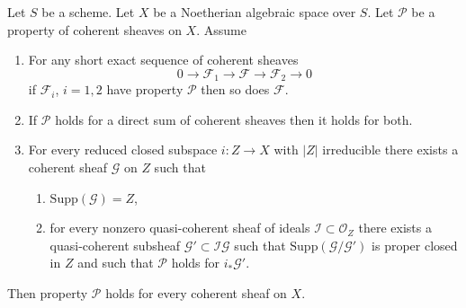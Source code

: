 \begin{lemma}
\label{lemma-property-higher-rank-cohomological}
Let $S$ be a scheme. Let $X$ be a Noetherian algebraic space over $S$.
Let $\mathcal{P}$ be a property of coherent sheaves on $X$. Assume
\begin{enumerate}
\item For any short exact sequence of coherent sheaves
$$
0 \to \mathcal{F}_1 \to \mathcal{F} \to \mathcal{F}_2 \to 0
$$
if $\mathcal{F}_i$, $i = 1, 2$ have property $\mathcal{P}$
then so does $\mathcal{F}$.
\item If $\mathcal{P}$ holds for a direct sum of coherent sheaves
then it holds for both.
\item For every reduced closed subspace $i : Z \to X$ with
$|Z|$ irreducible there exists a coherent sheaf $\mathcal{G}$ on $Z$
such that
\begin{enumerate}
\item $\text{Supp}(\mathcal{G}) = Z$,
\item for every nonzero quasi-coherent sheaf of ideals
$\mathcal{I} \subset \mathcal{O}_Z$ there exists a quasi-coherent
subsheaf $\mathcal{G}' \subset \mathcal{I}\mathcal{G}$ such that
$\text{Supp}(\mathcal{G}/\mathcal{G}')$ is proper closed in $Z$
and such that $\mathcal{P}$ holds for $i_*\mathcal{G}'$.
\end{enumerate}
\end{enumerate}
Then property $\mathcal{P}$ holds for every coherent sheaf on $X$.
\end{lemma}


